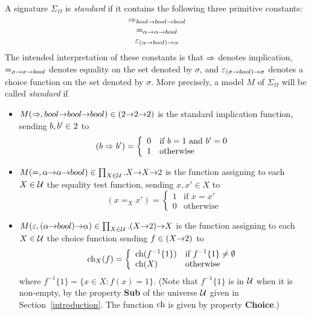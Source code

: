 A signature $\Sigma_{\Omega}$ is {\em standard\/} if it contains the
following three primitive constants:
\[
{\Rightarrow}_{{\sl bool}{\to}{\sl bool}{\to}{\sl bool}}
\]
\[
{=}_{\alpha{\to}\alpha{\to}{\sl bool}}
\]
\[
\varepsilon_{(\alpha{\to}{\sl bool}){\to}\alpha}
\]
The intended interpretation of these constants is that  $\Rightarrow$ denotes
implication, $=_{\sigma{\to}\sigma{\to}{\sl bool}}$ denotes equality on
the set denoted by $\sigma$, and
$\varepsilon_{(\sigma{\to}{\sl bool}){\to}\sigma}$ denotes a choice function
on the set denoted by $\sigma$. More precisely, a model $M$ of
$\Sigma_{\Omega}$ will be called {\em standard\/} if
\begin{itemize}

\item
$M({\Rightarrow},{\sl bool}{\to}{\sl bool}{\to}{\sl bool})\in(\mbox{\rm 2}{\to}\mbox{\rm 2}{\to}\mbox{\rm 2})$ is the
standard implication function, sending $b,b'\in\mbox{\rm 2}$ to
\[
(b\imp b') = \left\{ \begin{array}{ll}
                           0 & \mbox{if $b=1$ and $b'=0$} \\
                           1 & \mbox{otherwise}
                          \end{array}
             \right.%
\]

\item
$M({=},\alpha{\to}\alpha{\to}{\sl bool})\in\prod_{X\in{\cal U}}.X{\to}
X{\to}\mbox{\rm 2}$ is the function assigning to each $X\in{\cal U}$ the
equality test function, sending $x,x'\in X$ to
\[
(x=_{X}x') = \left\{ \begin{array}{ll}
                           1 & \mbox{if $x=x'$} \\
                           0 & \mbox{otherwise}
                          \end{array}
             \right.%
\]

\item
{}$M(\varepsilon,(\alpha{\to}{\sl bool}){\to}\alpha)\in\prod_{X\in{\cal
U}}.(X{\to}\mbox{\rm 2}){\to} X$ is the function assigning to each $X\in{\cal
U}$ the choice function sending $f\in(X{\to}\mbox{\rm 2})$ to
\[
\ch_{X}(f) = \left\{ \begin{array}{ll}
                           \ch(f^{-1}\{1\})
                             & \mbox{if $f^{-1}\{1\}\not=\emptyset$}\\
                           \ch(X) & \mbox{otherwise}
                          \end{array}
             \right.%
\]
where $f^{-1}\{1\}=\{x\in X : f(x)=1\}$. (Note that $f^{-1}\{1\}$ is in
$\cal U$ when it is non-empty, by the property {\bf Sub} of the
universe $\cal U$ given in Section~\ref{introduction}. The function
$\mbox{\rm ch}$ is given by property {\bf Choice}.)

\end{itemize}

